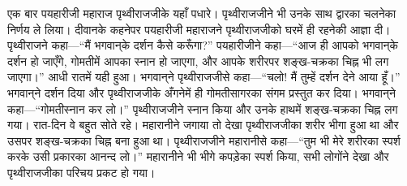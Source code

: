 \begin{sloppypar}\justifying{}
एक बार पयहारीजी महाराज पृथ्वीराजजीके यहाँ पधारे। पृथ्वीराजजीने भी उनके साथ द्वारका चलनेका निर्णय ले लिया। दीवानके कहनेपर पयहारीजी महाराजने पृथ्वीराजजीको घरमें ही रहनेकी आज्ञा दी। पृथ्वीराजने कहा—“मैं भगवान्‌के दर्शन कैसे करूँगा?” पयहारीजीने कहा—“आज ही आपको भगवान्‌के दर्शन हो जाएँगे, गोमतीमें आपका स्नान हो जाएगा, और आपके शरीरपर शङ्ख-चक्रका चिह्न भी लग जाएगा।” आधी रातमें यही हुआ। भगवान्‌ने पृथ्वीराजजीसे कहा—“चलो! मैं तुम्हें दर्शन देने आया हूँ।” भगवान्‌ने दर्शन दिया और पृथ्वीराजजीके अँगनेमें ही गोमती\-सागरका संगम प्रस्तुत कर दिया। भगवान्‌ने कहा—“गोमतीस्नान कर लो।” पृथ्वीराजजीने स्नान किया और उनके हाथमें शङ्ख-चक्रका चिह्न लग गया। रात-दिन वे बहुत सोते रहे। महारानीने जगाया तो देखा पृथ्वीराजजीका शरीर भीगा हुआ था और उसपर शङ्ख-चक्रका चिह्न बना हुआ था। पृथ्वीराजजीने महारानीसे कहा—“तुम भी मेरे शरीरका स्पर्श करके उसी प्रकारका आनन्द लो।” महारानीने भी भीगे कपड़ेका स्पर्श किया, सभी लोगोंने देखा और पृथ्वीराजजीका परिचय प्रकट हो गया।
\end{sloppypar}


